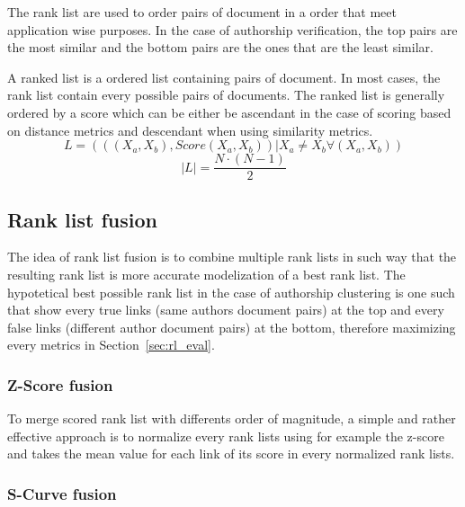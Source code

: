 The rank list are used to order pairs of document in a order that meet application wise purposes.
In the case of authorship verification, the top pairs are the most similar and the bottom pairs are the ones that are the least similar.

\begin{definition}
  A ranked list is a ordered list containing pairs of document.
  In most cases, the rank list contain every possible pairs of documents.
  The ranked list is generally ordered by a score which can be either be ascendant in the case of scoring based on distance metrics and descendant when using similarity metrics.
  \begin{equation}
    L = (((X_a, X_b), Score(X_a, X_b)) | X_a \neq X_b \forall (X_a, X_b))
  \end{equation}
  \begin{equation}
    |L| = \frac{N \cdot (N - 1)}{2}
  \end{equation}
\end{definition}

\subsection{Rank list fusion}
\label{sec:rank_list_fusion}

The idea of rank list fusion is to combine multiple rank lists in such way that the resulting rank list is more accurate modelization of a best rank list.
The hypotetical best possible rank list in the case of authorship clustering is one such that show every true links (same authors document pairs) at the top and every false links (different author document pairs) at the bottom, therefore maximizing every metrics in Section~\ref{sec:rl_eval}.

\subsubsection{Z-Score fusion}

To merge scored rank list with differents order of magnitude, a simple and rather effective approach is to normalize every rank lists using for example the z-score and takes the mean value for each link of its score in every normalized rank lists.

\subsubsection{S-Curve fusion}

